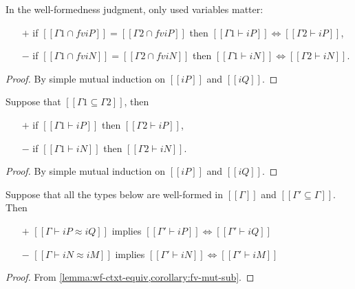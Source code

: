 \begin{lemma}
  \label{lemma:wf-ctxt-equiv}

  In the well-formedness judgment, only used variables matter:
  \begin{itemize}
  \item[$+$] if $[[{Γ1} ∩ fv iP]] = [[{Γ2} ∩ fv iP]]$ then
    $[[Γ1 ⊢ iP]] \iff [[Γ2 ⊢ iP]]$,
  \item[$-$] if $[[{Γ1} ∩ fv iN]] = [[{Γ2} ∩ fv iN]]$ then
    $[[Γ1 ⊢ iN]] \iff [[Γ2 ⊢ iN]]$.
  \end{itemize}
\end{lemma}
\begin{proof}
  By simple mutual induction on $[[iP]]$ and $[[iQ]]$. 
\end{proof}

\begin{lemma}
  \label{lemma:wf-weakening}
  Suppose that $[[{Γ1} ⊆ {Γ2}]]$, then
  \begin{itemize}
    \item[$+$] if $[[Γ1 ⊢ iP]]$ then $[[Γ2 ⊢ iP]]$,
    \item[$-$] if $[[Γ1 ⊢ iN]]$ then $[[Γ2 ⊢ iN]]$.
  \end{itemize}
\end{lemma}
\begin{proof}
  By simple mutual induction on $[[iP]]$ and $[[iQ]]$. 
\end{proof}

\begin{corollary}
  \label{lemma:mut-sub-types-wf-equiv}
  Suppose that all the types below are well-formed in $[[Γ]]$ and
  $[[{Γ'} ⊆ {Γ}]]$. Then
  \begin{itemize}
  \item[$+$] $[[Γ ⊢ iP ≈ iQ]]$ implies $[[Γ' ⊢ iP]] \iff [[Γ' ⊢ iQ]]$
  \item[$-$] $[[Γ ⊢ iN ≈ iM]]$ implies $[[Γ' ⊢ iN]] \iff [[Γ' ⊢ iM]]$
  \end{itemize}
\end{corollary}
\begin{proof}
  From \cref{lemma:wf-ctxt-equiv,corollary:fv-mut-sub}.
\end{proof}


